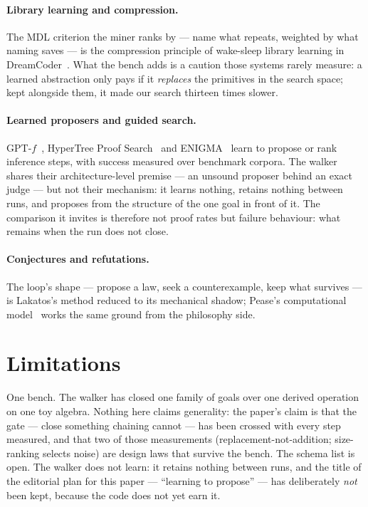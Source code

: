 \documentclass[11pt]{article}
\theoremstyle{remark}\newtheorem{remark}{Remark}
\begin{document}
\paragraph{Library learning and compression.} The MDL criterion the miner
ranks by --- name what repeats, weighted by what naming saves --- is the
compression principle of wake-sleep library learning in
DreamCoder~\cite{ellis2021dreamcoder}. What the bench adds is a caution
those systems rarely measure: a learned abstraction only pays if it
\emph{replaces} the primitives in the search space; kept alongside them, it
made our search thirteen times slower.

\paragraph{Learned proposers and guided search.} GPT-$f$~\cite{polu2020gptf},
HyperTree Proof Search~\cite{lample2022htps} and
ENIGMA~\cite{jakubuv2020enigma} learn to propose or rank inference steps,
with success measured over benchmark corpora. The walker shares their
architecture-level premise --- an unsound proposer behind an exact judge ---
but not their mechanism: it learns nothing, retains nothing between runs,
and proposes from the structure of the one goal in front of it. The
comparison it invites is therefore not proof rates but failure behaviour:
what remains when the run does not close.

\paragraph{Conjectures and refutations.} The loop's shape --- propose a law,
seek a counterexample, keep what survives --- is Lakatos's method reduced to
its mechanical shadow; Pease's computational model~\cite{pease2007lakatos}
works the same ground from the philosophy side.

\section{Limitations}
\label{sec:limitations}

One bench. The walker has closed one family of goals over one derived
operation on one toy algebra. Nothing here claims generality: the paper's
claim is that the gate --- close something chaining cannot --- has been
crossed with every step measured, and that two of those measurements
(replacement-not-addition; size-ranking selects noise) are design laws that
survive the bench. The schema list is open. The walker does not learn: it
retains nothing between runs, and the title of the editorial plan for this
paper --- ``learning to propose'' --- has deliberately \emph{not} been kept,
because the code does not yet earn it.
\end{document}
